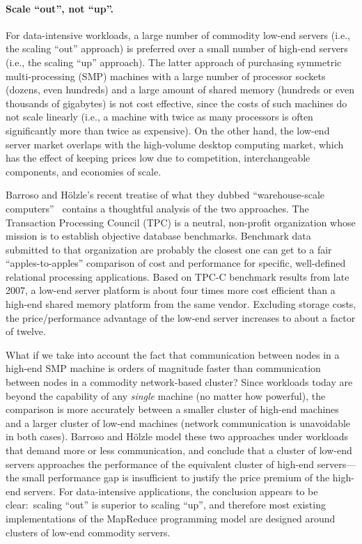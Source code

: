 \paragraph{Scale ``out'', not ``up''.}
For data-intensive workloads, a large number of commodity low-end
servers (i.e., the scaling ``out'' approach) is preferred over a small
number of high-end servers (i.e., the scaling ``up'' approach).  The
latter approach of purchasing symmetric multi-processing (SMP)
machines with a large number of processor sockets (dozens, even
hundreds) and a large amount of shared memory (hundreds or even
thousands of gigabytes) is not cost effective, since the costs of such
machines do not scale linearly (i.e., a machine with twice as many
processors is often significantly more than twice as expensive).  On
the other hand, the low-end server market overlaps with the
high-volume desktop computing market, which has the effect of keeping
prices low due to competition, interchangeable components, and
economies of scale.

Barroso and H\"{o}lzle's recent treatise of what they dubbed
``warehouse-scale computers''~\cite{Barroso_Holzle_2009} contains a
thoughtful analysis of the two approaches.  The Transaction Processing
Council (TPC) is a neutral, non-profit organization whose mission is
to establish objective database benchmarks.  Benchmark data submitted
to that organization are probably the closest one can get to a fair
``apples-to-apples'' comparison of cost and performance for specific,
well-defined relational processing applications.  Based on
\mbox{TPC-C} benchmark results from late 2007, a low-end server
platform is about four times more cost efficient than a high-end
shared memory platform from the same vendor.  Excluding storage costs,
the price/performance advantage of the low-end server increases to
about a factor of twelve.

What if we take into account the fact that communication between nodes
in a high-end SMP machine is orders of magnitude faster than
communication between nodes in a commodity network-based cluster?
Since workloads today are beyond the capability of any {\it single}
machine (no matter how powerful), the comparison is more accurately
between a smaller cluster of high-end machines and a larger cluster of
low-end machines (network communication is unavoidable in both cases).
Barroso and H\"{o}lzle model these two approaches under workloads that
demand more or less communication, and conclude that a cluster of
low-end servers approaches the performance of the equivalent cluster
of high-end servers---the small performance gap is insufficient to
justify the price premium of the high-end servers.  For data-intensive
applications, the conclusion appears to be clear:\ scaling ``out'' is
superior to scaling ``up'', and therefore most existing
implementations of the MapReduce programming model are designed around
clusters of low-end commodity servers.

